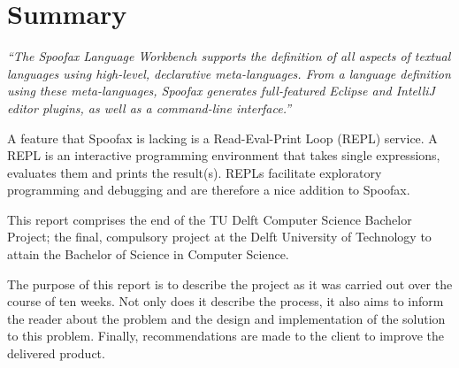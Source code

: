 \chapter{Summary}
\label{cha:summary}

\textit{``The Spoofax Language Workbench supports the definition of all aspects
of textual languages using high-level, declarative meta-languages. From a
language definition using these meta-languages, Spoofax generates full-featured
Eclipse and IntelliJ editor plugins, as well as a command-line interface.''}

A feature that Spoofax is lacking is a Read-Eval-Print Loop (REPL) service. A
REPL is an interactive programming environment that takes single expressions,
evaluates them and prints the result(s). REPLs facilitate exploratory
programming and debugging and are therefore a nice addition to Spoofax.

This report comprises the end of the TU Delft Computer Science Bachelor Project;
the final, compulsory project at the Delft University of Technology to attain
the Bachelor of Science in Computer Science.

The purpose of this report is to describe the project as it was carried out over
the course of ten weeks. Not only does it describe the process, it also aims to
inform the reader about the problem and the design and implementation of the
solution to this problem. Finally, recommendations are made to the client to
improve the delivered product.

